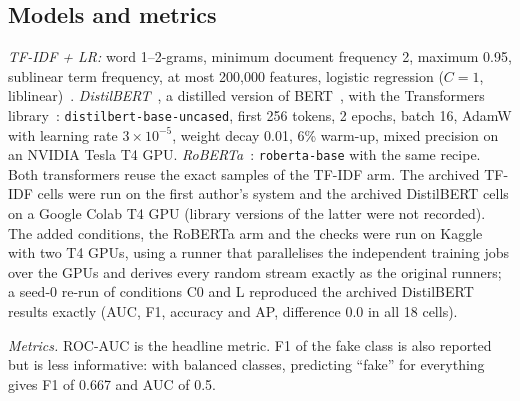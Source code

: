 \subsection{Models and metrics}\label{sec:models}
\emph{TF-IDF + LR:} word 1--2-grams, minimum document frequency 2, maximum 0.95, sublinear term frequency, at most 200,000 features, logistic regression ($C{=}1$, liblinear)~\cite{pedregosa2011sklearn}. \emph{DistilBERT}~\cite{sanh2019distilbert}, a distilled version of BERT~\cite{devlin2019bert}, with the Transformers library~\cite{wolf2020transformers}: \texttt{distilbert-base-uncased}, first 256 tokens, 2 epochs, batch 16, AdamW with learning rate $3\times10^{-5}$, weight decay 0.01, 6\% warm-up, mixed precision on an NVIDIA Tesla T4 GPU. \emph{RoBERTa}~\cite{liu2019roberta}: \texttt{roberta-base} with the same recipe. Both transformers reuse the exact samples of the TF-IDF arm. The archived TF-IDF cells were run on the first author's system and the archived DistilBERT cells on a Google Colab T4 GPU (library versions of the latter were not recorded). The added conditions, the RoBERTa arm and the checks were run on Kaggle with two T4 GPUs, using a runner that parallelises the independent training jobs over the GPUs and derives every random stream exactly as the original runners; a seed-0 re-run of conditions C0 and L reproduced the archived DistilBERT results exactly (AUC, F1, accuracy and AP, difference 0.0 in all 18 cells).

\emph{Metrics.} ROC-AUC is the headline metric. F1 of the fake class is also reported but is less informative: with balanced classes, predicting ``fake'' for everything gives F1 of 0.667 and AUC of 0.5.

